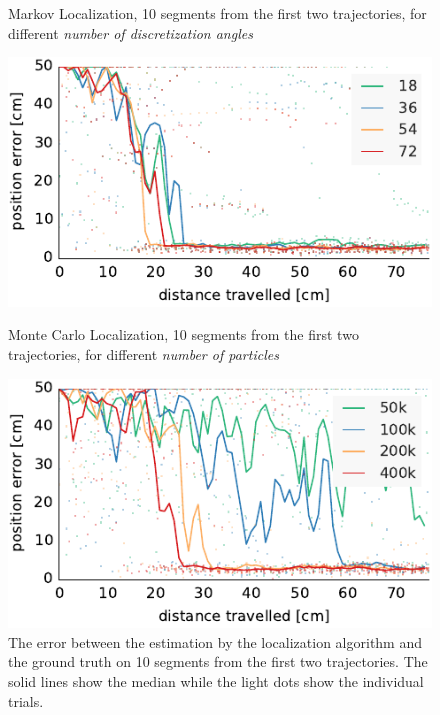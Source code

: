 \documentclass[letterpaper, 10pt, conference]{ieeeconf}
\begin{document}
\begin{figure}

\begin{center}
Markov Localization, 10 segments from the first two trajectories, for different \emph{number of discretization angles}
\end{center}
\includegraphics{ml-small_runs_random_12-xy}

\vspace{.5em}

\begin{center}
Monte Carlo Localization, 10 segments from the first two trajectories, for different \emph{number of particles}
\end{center}
\includegraphics{mcl-small_runs_random_12-xy}

\caption{
The error between the estimation by the localization algorithm and the ground truth on 10 segments from the first two trajectories.
The solid lines show the median while the light dots show the individual trials.}
\label{fig:small-runs}
\end{figure}
\end{document}
